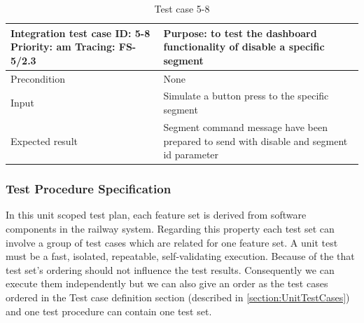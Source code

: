 \begin{table}[H]
	\caption{Test case 5-8}
	\label{table:TCase-FS5-8}
	\begin{center}
		\renewcommand{\arraystretch}{1.8}
		\begin{tabu} 
			to 0.9 \textwidth
			{  X[0.4, c] X[c] }
			\toprule
			Integration test case ID: 5-8 \newline Priority: am \newline Tracing: FS-5/2.3 & Purpose: to test the dashboard functionality of disable a specific segment               \\ \midrule
			Precondition                                                                   & None                                                                           \\
			Input                                                                          & Simulate a button press to the specific segment                                \\
			Expected result                                                                & Segment command message have been prepared to send with disable and segment id parameter \\ \bottomrule
		\end{tabu}
	\end{center}
\end{table}







\noindent\subsubsection{Test Procedure Specification}
In this unit scoped test plan, each feature set is derived from software components in the railway system. Regarding this property each test set can involve a group of test cases which are related for one feature set. A unit test must be a fast, isolated, repeatable, self-validating execution. Because of the that test set's ordering should not influence the test results. Consequently we can execute them independently but we can also give an order as the test cases ordered in the Test case definition section (described in \autoref{section:UnitTestCases}) and one test procedure can contain one test set. 

